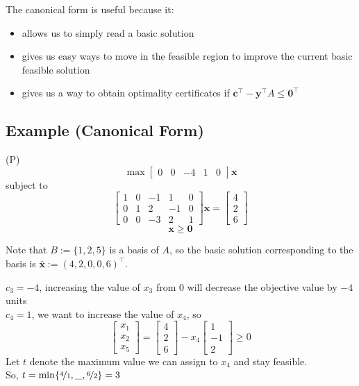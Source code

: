 The canonical form is useful because it:
\begin{itemize}
    \item allows us to simply read a basic solution
    \item gives us easy ways to move in the feasible region to improve the current basic
    feasible solution
    \item gives us a way to obtain optimality certificates if
    $\bm{c}^\top -\bm{y}^\top A\le \bm{0}^\top $
\end{itemize}

\subsection{Example (Canonical Form)}
(P)
\[\max \begin{bmatrix}
    0 & 0 & -4 & 1 & 0
\end{bmatrix}\bm{x}\]
subject to
\[
    \begin{bmatrix}
        1 & 0 & -1 & 1 & 0\\
        0 & 1 & 2 & -1 & 0\\
        0 & 0 & -3 & 2 & 1
    \end{bmatrix}\bm{x}
    =
    \begin{bmatrix}
        4\\
        2\\
        6
    \end{bmatrix} \]
\[ \bm{x}\ge \bm{0} \]

Note that $B:=\{1,2,5\}$ is a basis of $A$, so the basic solution corresponding to the
basis is
$\bm{\bar{x}}:=(4,2,0,0,6)^\top$.

$c_3=-4$, increasing the value of $x_3$ from $0$ will decrease the objective value by $-4$ units\\
$c_4=1$, we want to increase the value of $x_4$, so
\[
    \begin{bmatrix}
        x_1\\
        x_2\\
        x_5
    \end{bmatrix}
    =
    \begin{bmatrix}
        4\\
        2\\
        6
    \end{bmatrix}
    -x_4
    \begin{bmatrix}
        1\\
        -1\\
        2
    \end{bmatrix}
    \ge 0
\]
Let $t$ denote the maximum value we can assign to $x_4$ and stay feasible.\\
So,
$t=\min\{\nicefrac{4}{1},\_,\nicefrac{6}{2}\}=3$